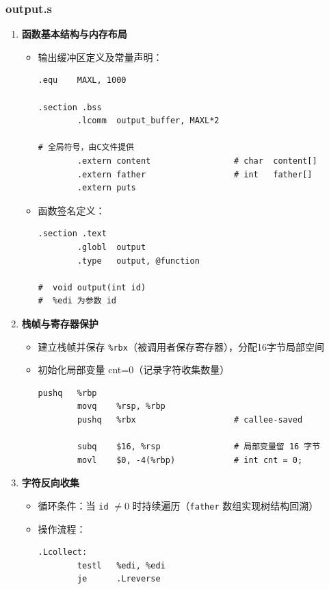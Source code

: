 \documentclass[10pt,a4paper]{article}
\begin{document}
\subsubsection{output.s}

\begin{enumerate}
    \item \textbf{函数基本结构与内存布局}
    \begin{itemize}
        \item 输出缓冲区定义及常量声明：
        \begin{lstlisting}[language={[x86masm]Assembler}]
.equ    MAXL, 1000

.section .bss
        .lcomm  output_buffer, MAXL*2

# 全局符号，由C文件提供
        .extern content                 # char  content[]
        .extern father                  # int   father[]
        .extern puts
        \end{lstlisting}
        \item 函数签名定义：
        \begin{lstlisting}[language={[x86masm]Assembler}]
.section .text
        .globl  output
        .type   output, @function

#  void output(int id)
#  %edi 为参数 id
        \end{lstlisting}
    \end{itemize}
    
    \item \textbf{栈帧与寄存器保护}
    \begin{itemize}
        \item 建立栈帧并保存 \verb|%rbx|（被调用者保存寄存器），分配16字节局部空间
        \item 初始化局部变量 cnt=0（记录字符收集数量）
        \begin{lstlisting}[language={[x86masm]Assembler}]
        pushq   %rbp
        movq    %rsp, %rbp
        pushq   %rbx                    # callee-saved

        subq    $16, %rsp               # 局部变量留 16 字节
        movl    $0, -4(%rbp)            # int cnt = 0;
        \end{lstlisting}
    \end{itemize}
    
    \item \textbf{字符反向收集}
    \begin{itemize}
        \item 循环条件：当 \verb|id| \(\neq 0\) 时持续遍历（\verb|father| 数组实现树结构回溯）
        \item 操作流程：
        \begin{lstlisting}[language={[x86masm]Assembler}]
.Lcollect:
        testl   %edi, %edi
        je      .Lreverse


\end{lstlisting}
\end{itemize}
\end{enumerate}
\end{document}
